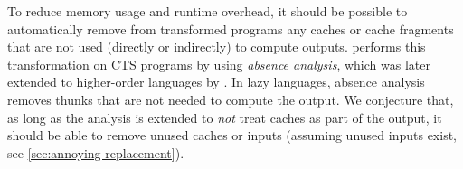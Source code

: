 \label{sec:cache-pruning}
To reduce memory usage and runtime overhead, it should be possible to
automatically remove from transformed programs any caches or cache fragments
that are not used (directly or indirectly) to compute outputs. 
performs this transformation on CTS programs by using
\emph{absence analysis}, which was later extended to higher-order languages by
\citet{Sergey2014modular}. In lazy languages, absence analysis removes thunks
that are not needed to compute the output. We conjecture that, as long as the
analysis is extended to \emph{not} treat caches as part of the output, it should
be able to remove unused caches or inputs (assuming unused inputs exist, see
\cref{sec:annoying-replacement}).



